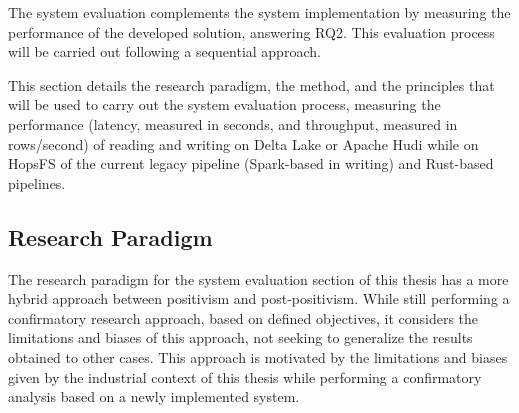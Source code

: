 The system evaluation complements the system implementation by measuring the performance of the developed solution, answering RQ2. This evaluation process will be carried out following a sequential approach.

This section details the research paradigm, the method, and the principles that will be used to carry out the system evaluation process, measuring the performance (latency, measured in seconds, and throughput, measured in rows/second) of reading and writing on Delta Lake or Apache Hudi while on \gls{HopsFS} of the current legacy pipeline (Spark-based in writing) and Rust-based pipelines. 

\subsection{Research Paradigm}
The research paradigm for the system evaluation section of this thesis has a more hybrid approach between positivism and post-positivism. While still performing a confirmatory research approach, based on defined objectives, it considers the limitations and biases of this approach, not seeking to generalize the results obtained to other cases. This approach is motivated by the limitations and biases given by the industrial context of this thesis while performing a confirmatory analysis based on a newly implemented system.

